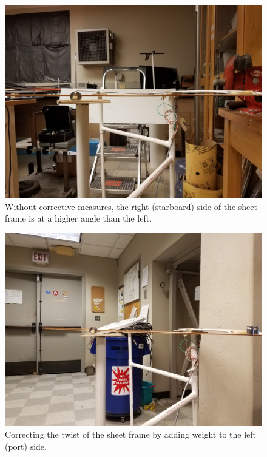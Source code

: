 \documentclass[12pt]{report} %
\begin{document}
\begin{figure}
\includegraphics[width = 0.7\linewidth]{skewness.jpg}
\centering
\caption{Without corrective measures, the right (starboard) side of the sheet frame is at a higher angle than the left.}
\label{skewness}
\end{figure}

\begin{figure}
\includegraphics[width = 0.7\linewidth]{skewness_correction.jpg}
\centering
\caption{Correcting the twist of the sheet frame by adding weight to the left (port) side.}
\label{skewness_correction}
\end{figure}
\end{document}
